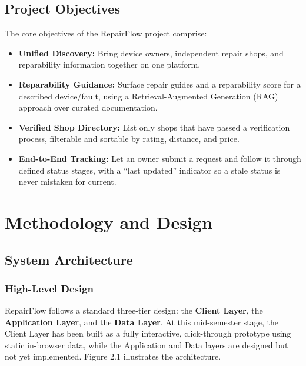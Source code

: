 \documentclass[11pt,a4paper]{report}
\begin{document}
\section{Project Objectives}

The core objectives of the RepairFlow project comprise:

\begin{itemize}
    \item \textbf{Unified Discovery:} Bring device owners, independent repair shops, and reparability information together on one platform.
    \item \textbf{Reparability Guidance:} Surface repair guides and a reparability score for a described device/fault, using a Retrieval-Augmented Generation (RAG) approach over curated documentation.
    \item \textbf{Verified Shop Directory:} List only shops that have passed a verification process, filterable and sortable by rating, distance, and price.
    \item \textbf{End-to-End Tracking:} Let an owner submit a request and follow it through defined status stages, with a ``last updated'' indicator so a stale status is never mistaken for current.
\end{itemize}

\chapter{Methodology and Design}

\section{System Architecture}

\subsection{High-Level Design}

RepairFlow follows a standard three-tier design: the \textbf{Client Layer}, the \textbf{Application Layer}, and the \textbf{Data Layer}. At this mid-semester stage, the Client Layer has been built as a fully interactive, click-through prototype using static in-browser data, while the Application and Data layers are designed but not yet implemented. Figure 2.1 illustrates the architecture.
\end{document}
